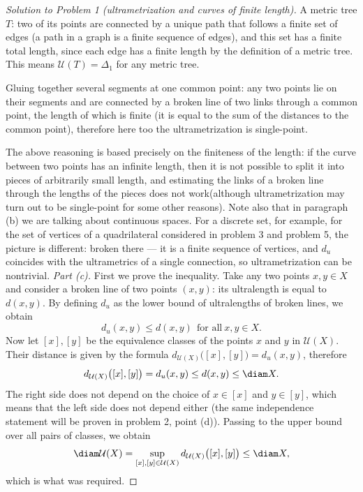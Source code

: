 \documentclass[a4paper,12pt]{report}
\begin{document}
\begin{proof}[Solution to Problem \textup{1} \textup{(}ultrametrization and curves of finite length\textup{)}]
A metric tree $T$\textup{:} two of its points are connected by a unique path that follows a finite set of edges \textup{(}a path in a graph is a finite sequence of edges\textup{)}, and this set has a finite total length, since each edge has a finite length by the definition of a metric tree. This means $\mathcal U(T)=\Delta_1$ for any metric tree.

Gluing together several segments at one common point\textup{:} any two points lie on their segments and are connected by a broken line of two links through a common point, the length of which is finite \textup{(}it is equal to the sum of the distances to the common point\textup{)}, therefore here too the ultrametrization is single-point.

The above reasoning is based precisely on the finiteness of the length\textup{:} if the curve between two points has an infinite length, then it is not possible to split it into pieces of arbitrarily small length, and estimating the links of a broken line through the lengths of the pieces does not work\textup{(}although ultrametrization may turn out to be single-point for some other reasons\textup{)}. Note also that in paragraph \textup{(b)} we are talking about continuous spaces. For a discrete set, for example, for the set of vertices of a quadrilateral considered in problem \textup{3} and problem \textup{5}, the picture is different\textup{:} broken there --- it is a finite sequence of vertices, and $d_u$ coincides with the ultrametrics of a single connection, so ultrametrization can be nontrivial.
\textit{Part \textup{(c)}.} First we prove the inequality. Take any two points $x,y\in X$ and consider a broken line of two points $(x,y)$\textup{:} its ultralength is equal to $d(x,y)$. By defining $d_u$ as the lower bound of ultralengths of broken lines, we obtain
\[
d_u(x,y)\le d(x,y)\ \ \text{for all}\ x,y\in X .
\]
Now let $[x],[y]$ be the equivalence classes of the points $x$ and $y$ in $\mathcal U(X)$. Their distance is given by the formula $d_{\mathcal U(X)}\bigl([x],[y]\bigr)=d_u(x,y)$, therefore
\[
d_{\mathcal U(X)}\bigl([x],[y]\bigr)=d_u(x,y)\le d(x,y)\le\diam X .
\]
The right side does not depend on the choice of $x\in[x]$ and $y\in[y]$, which means that the left side does not depend either \textup{(}the same independence statement will be proven in problem \textup{2}, point \textup{(d)}\textup{)}. Passing to the upper bound over all pairs of classes, we obtain
\[
\diam\mathcal U(X)=\sup_{[x],[y]\in\mathcal U(X)}d_{\mathcal U(X)}\bigl([x],[y]\bigr)\le\diam X ,
\]
which is what was required.


\end{proof}
\end{document}
